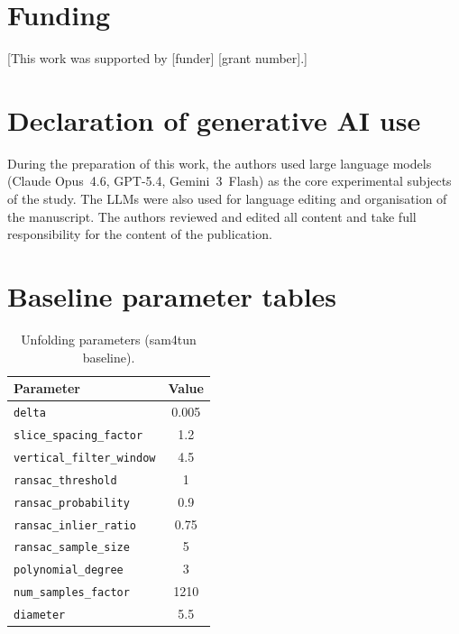 \documentclass[a4paper,fleqn]{cas-dc}
\begin{document}
\section*{Funding}

{[This work was supported by [funder] [grant number].]}

\section*{Declaration of generative AI use}

During the preparation of this work, the authors used large language models (Claude Opus~4.6, GPT-5.4, Gemini~3~Flash) as the core experimental subjects of the study. The LLMs were also used for language editing and organisation of the manuscript. The authors reviewed and edited all content and take full responsibility for the content of the publication.



\appendix

\section{Baseline parameter tables}\label{app:params}

\begin{table}[ht]
\caption{Unfolding parameters (sam4tun baseline).}\label{tab:unfold-params}
\begin{tabular*}{\tblwidth}{@{} l c @{}}
\toprule
Parameter & Value \\
\midrule
\texttt{delta} & 0.005 \\
\texttt{slice\_spacing\_factor} & 1.2 \\
\texttt{vertical\_filter\_window} & 4.5 \\
\texttt{ransac\_threshold} & 1 \\
\texttt{ransac\_probability} & 0.9 \\
\texttt{ransac\_inlier\_ratio} & 0.75 \\
\texttt{ransac\_sample\_size} & 5 \\
\texttt{polynomial\_degree} & 3 \\
\texttt{num\_samples\_factor} & 1210 \\
\texttt{diameter} & 5.5 \\
\bottomrule
\end{tabular*}
\end{table}
\end{document}
